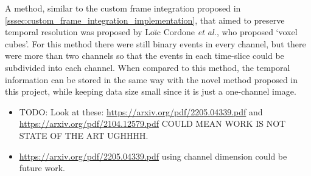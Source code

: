 A method, similar to the custom frame integration proposed in \cref{sssec:custom_frame_integration_implementation}, that aimed to preserve temporal resolution was proposed by Lo\"ic Cordone \textit{et al.}, who proposed `voxel cubes'\cite{MiniVovelCubes}. For this method there were still binary events in every channel, but there were more than two channels so that the events in each time-slice could be subdivided into each channel. When compared to this method, the temporal information can be stored in the same way with the novel method proposed in this project, while keeping data size small since it is just a one-channel image. 

\color{red}
\begin{itemize}
    \item TODO: Look at these: \url{https://arxiv.org/pdf/2205.04339.pdf} and \url{https://arxiv.org/pdf/2104.12579.pdf} COULD MEAN WORK IS NOT STATE OF THE ART UGHHHH. 
    \item \url{https://arxiv.org/pdf/2205.04339.pdf} using channel dimension could be future work.
\end{itemize}
\color{black}
